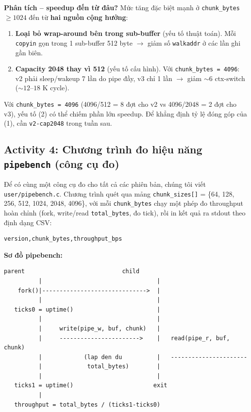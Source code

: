 \documentclass[11pt,a4paper]{article}
\begin{document}
\textbf{Phân tích -- speedup đến từ đâu?} Mức tăng đặc biệt mạnh ở \texttt{chunk\_bytes} $\geq 1024$ đến từ \textbf{hai nguồn cộng hưởng}:

\begin{enumerate}
  \item \textbf{Loại bỏ wrap-around bên trong sub-buffer} (yếu tố thuật toán). Mỗi \texttt{copyin} gọn trong 1 sub-buffer 512 byte $\rightarrow$ giảm số \texttt{walkaddr} ở các lần ghi gần biên.
  \item \textbf{Capacity 2048 thay vì 512} (yếu tố cấu hình). Với \texttt{chunk\_bytes = 4096}: v2 phải sleep/wakeup 7 lần do pipe đầy, v3 chỉ 1 lần $\rightarrow$ giảm $\sim 6$ ctx-switch ($\sim 12$--$18$ K cycle).
\end{enumerate}

Với \texttt{chunk\_bytes = 4096} (4096/512 = 8 đợt cho v2 vs 4096/2048 = 2 đợt cho v3), yếu tố (2) có thể chiếm phần lớn speedup. Để khẳng định tỷ lệ đóng góp của (1), cần \texttt{v2-cap2048} trong tuần sau.

\subsection{Activity 4: Chương trình đo hiệu năng \texttt{pipebench} (công cụ đo)}

Để có cùng một công cụ đo cho tất cả các phiên bản, chúng tôi viết \texttt{user/pipebench.c}. Chương trình quét qua mảng \texttt{chunk\_sizes[]} = \{64, 128, 256, 512, 1024, 2048, 4096\}, với mỗi \texttt{chunk\_bytes} chạy một phép đo throughput hoàn chỉnh (fork, write/read \texttt{total\_bytes}, đo tick), rồi in kết quả ra stdout theo định dạng CSV:

\begin{lstlisting}[style=plain]
version,chunk_bytes,throughput_bps
\end{lstlisting}

\textbf{Sơ đồ pipebench:}

\begin{lstlisting}[style=plain]
        parent                            child
          |                                 |
    fork()|------------------------------>  |
          |                                 |
   ticks0 = uptime()                        |
          |                                 |
          |     write(pipe_w, buf, chunk)   |
          |     ----------------------->    |   read(pipe_r, buf, chunk)
          |            (lap den du          |   ----------------------
          |             total_bytes)        |
          |                                 |
   ticks1 = uptime()                       exit
          |
   throughput = total_bytes / (ticks1-ticks0)
\end{lstlisting}
\end{document}
